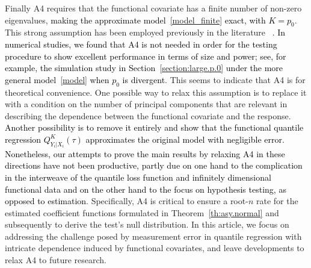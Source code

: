 \documentclass[times,sort&compress,3p]{elsarticle}
\theoremstyle{plain}%
\theoremstyle{definition}
\newcommand{\ml}[1]{\textcolor{black}{{#1}}}
\begin{document}
Finally A4 requires that the functional covariate has a finite number of non-zero eigenvalues, \ml{making the approximate model~\eqref{model_finite} exact, with $K = p_0$}. This strong assumption has been employed previously in the literature ~\citep{Li+:2010,Li+Wang+Carroll:13}. \ml{In numerical studies, we found that A4 is not needed in order for the testing procedure to show excellent performance in terms of size and power; see, for example, the simulation study in Section~\ref{section:large.p.0} under the more general model~\eqref{model} when $p_0$ is divergent}. This seems to indicate that A4 is for theoretical convenience. %
One possible way to relax this assumption is to replace it with a condition on the number of principal components that are relevant in describing the dependence between the functional covariate and the response. \ml{Another possibility is to remove it entirely and show that the functional quantile regression $Q^K_{Y_i|X_i}(\tau)$ approximates the original model with negligible error. Nonetheless, our attempts to prove the main results by relaxing A4 in these directions have not been productive, partly due on one hand to the complication in the interweave of the quantile loss function and infinitely dimensional functional data and on the other hand to the focus on hypothesis testing, as opposed to estimation}. %
Specifically, A4 is critical to ensure a root-$n$ rate for the estimated coefficient functions formulated in Theorem~\ref{th:asy.normal} and subsequently to derive the test's null distribution. {} 
In this article, we focus on addressing the challenge posed by measurement error in quantile regression with intricate dependence induced by functional covariates, and leave developments to relax A4 to future research.
\end{document}
